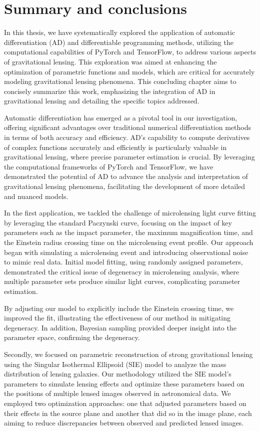 \chapter{Summary and conclusions}
\label{chap:conclusions}

In this thesis, we have systematically explored the application of automatic differentiation (AD) and differentiable programming methods, utilizing the computational capabilities of PyTorch and TensorFlow, to address various aspects of gravitational lensing. This exploration was aimed at enhancing the optimization of parametric functions and models, which are critical for accurately modeling gravitational lensing phenomena. This concluding chapter aims to concisely summarize this work, emphasizing the integration of AD in gravitational lensing and detailing the specific topics addressed.

Automatic differentiation has emerged as a pivotal tool in our investigation, offering significant advantages over traditional numerical differentiation methods in terms of both accuracy and efficiency. AD's capability to compute derivatives of complex functions accurately and efficiently is particularly valuable in gravitational lensing, where precise parameter estimation is crucial. By leveraging the computational frameworks of PyTorch and TensorFlow, we have demonstrated the potential of AD to advance the analysis and interpretation of gravitational lensing phenomena, facilitating the development of more detailed and nuanced models.

In the first application, we tackled the challenge of microlensing light curve fitting by leveraging the standard Paczynski curve, focusing on the impact of key parameters such as the impact parameter, the maximum magnification time, and the Einstein radius crossing time on the microlensing event profile. Our approach began with simulating a microlensing event and introducing observational noise to mimic real data. Initial model fitting, using randomly assigned parameters, demonstrated the critical issue of degeneracy in microlensing analysis, where multiple parameter sets produce similar light curves, complicating parameter estimation.

By adjusting our model to explicitly include the Einstein crossing time, we improved the fit, illustrating the effectiveness of our method in mitigating degeneracy. In addition, Bayesian sampling provided deeper insight into the parameter space, confirming the degeneracy.

Secondly, we focused on parametric reconstruction of strong gravitational lensing using the Singular Isothermal Ellipsoid (SIE) model to analyze the mass distribution of lensing galaxies. Our methodology utilized the SIE model's parameters to simulate lensing effects and optimize these parameters based on the positions of multiple lensed images observed in astronomical data. We employed two optimization approaches: one that adjusted parameters based on their effects in the source plane and another that did so in the image plane, each aiming to reduce discrepancies between observed and predicted lensed images.

